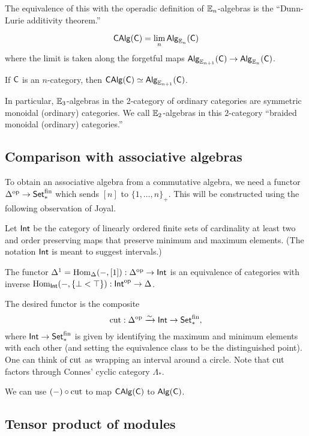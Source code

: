 \documentclass{article}
\begin{document}
The equivalence of this with the operadic definition of $\mathbb{E}_n$-algebras is the ``Dunn-Lurie additivity theorem.''

\begin{thm}
	\[
		\mathsf{CAlg}(\mathsf{C}) = \lim_n \mathsf{Alg}_{\mathbb{E}_n}(\mathsf{C})
	\]
	where the limit is taken along the forgetful maps $\mathsf{Alg}_{\mathbb{E}_{n+1}}(\mathsf{C}) \to \mathsf{Alg}_{\mathbb{E}_n}(\mathsf{C})$.
\end{thm}

\begin{thm}
	If $\mathsf{C}$ is an $n$-category, then $\mathsf{CAlg}(\mathsf{C}) \simeq \mathsf{Alg}_{\mathbb{E}_{n+1}}(\mathsf{C})$.
\end{thm}

In particular, $\mathbb{E}_3$-algebras in the 2-category of ordinary categories are symmetric monoidal (ordinary) categories.
We call $\mathbb{E}_2$-algebras in this $2$-category ``braided monoidal (ordinary) categories.''

\subsection{Comparison with associative algebras}

To obtain an associative algebra from a commutative algebra, we need a functor $\Delta^{\mathrm{op}} \to \mathsf{Set}_*^{\mathrm{fin}}$ which sends $[n]$ to $\{ 1, \dots, n\}_+$.
This will be constructed using the following observation of Joyal.

Let $\mathsf{Int}$ be the category of linearly ordered finite sets of cardinality at least two and order preserving maps that preserve minimum and maximum elements.
(The notation $\mathsf{Int}$ is meant to suggest intervals.)

\begin{lem}
	The functor $\Delta^1 = \operatorname{Hom}_\Delta(-, [1]): \Delta^{\mathrm{op}} \to \mathsf{Int}$ is an equivalence of categories with inverse $\operatorname{Hom}_{\mathsf{Int}}(-, \{ \bot < \top \}): \mathsf{Int}^{\mathrm{op}} \to \Delta$.
\end{lem}

The desired functor is the composite
\[
	\operatorname{cut}: \Delta^{\mathrm{op}} \xrightarrow{\sim} \mathsf{Int} \to \mathsf{Set}_*^{\mathrm{fin}},
\]
where $\mathsf{Int} \to \mathsf{Set}_*^{\mathrm{fin}}$ is given by identifying the maximum and minimum elements with each other (and setting the equivalence class to be the distinguished point).
One can think of $\operatorname{cut}$ as wrapping an interval around a circle.
Note that $\operatorname{cut}$ factors through Connes' cyclic category $\Lambda_*$.

We can use $(-) \circ \operatorname{cut}$ to map $\mathsf{CAlg}(\mathsf{C})$ to $\mathsf{Alg}(\mathsf{C})$.

\subsection{Tensor product of modules}
\end{document}
